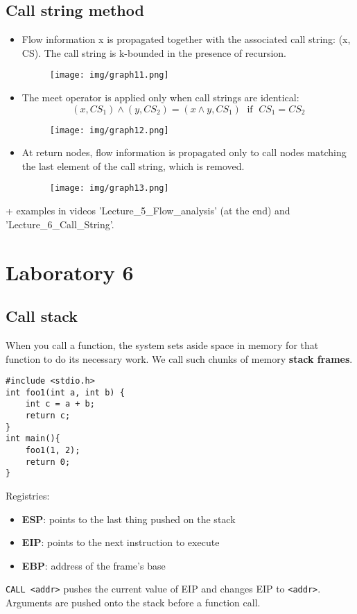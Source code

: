 \documentclass[a4paper, 10pt, titlepage]{article}
\begin{document}
\subsection{Call string method}
\begin{itemize}
\item Flow information x is propagated together with the associated call string: (x, CS). The call string is k-bounded in the presence of recursion.
\begin{figure}[h]
\centering
\texttt{[image: img/graph11.png]}
\end{figure}
\item The meet operator is applied only when call strings are identical:
$$(x, CS_1) \wedge (y, CS_2) = (x \wedge y, CS_1) \;\text{ if }\; CS_1 = CS_2$$
\begin{figure}[h]
\centering
\texttt{[image: img/graph12.png]}
\end{figure}
\item At return nodes, flow information is propagated only to call nodes matching the last element of the call string, which is removed.\\
\begin{figure}[h]
\centering
\texttt{[image: img/graph13.png]}
\end{figure}
\end{itemize}
+ examples in videos 'Lecture\_5\_Flow\_analysis' (at the end) and 'Lecture\_6\_Call\_String'.

\newpage
\section{Laboratory 6}
\subsection{Call stack}
When you call a function, the system sets aside space in memory for that function to do its necessary work. We call such chunks of memory \textbf{stack frames}. \medskip\\
\begin{minipage}{0.45\textwidth}
\begin{lstlisting}
#include <stdio.h>
int foo1(int a, int b) {
	int c = a + b;
	return c;
}
int main(){
	foo1(1, 2);
	return 0;
}
\end{lstlisting}
\end{minipage}
\begin{minipage}{0.5\textwidth}
\begin{scriptsize}
Registries:
\begin{itemize}
\item \textbf{ESP}: points to the last thing pushed on the stack
\item \textbf{EIP}: points to the next instruction to execute
\item \textbf{EBP}: address of the frame's base
\end{itemize}
\lstinline|CALL <addr>| pushes the current value of EIP and changes EIP to \lstinline|<addr>|.\medskip \\
Arguments are pushed onto the stack before a function call.
\end{scriptsize}
\end{minipage}
\end{document}
